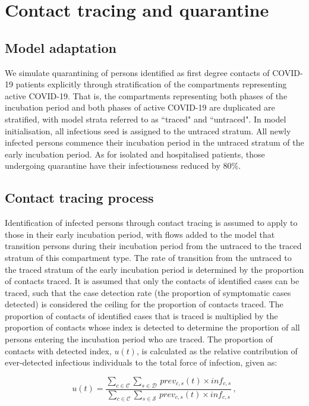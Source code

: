 \section{Contact tracing and quarantine}

\subsection{Model adaptation}
We simulate quarantining of persons identified as first degree contacts of COVID-19 patients explicitly through stratification of the compartments representing active COVID-19.
That is, the compartments representing both phases of the incubation period and both phases of active COVID-19 are duplicated are stratified, with model strata referred to as ``traced" and ``untraced".
In model initialisation, all infectious seed is assigned to the untraced stratum.
All newly infected persons commence their incubation period in the untraced stratum of the early incubation period.
As for isolated and hospitalised patients, those undergoing quarantine have their infectiousness reduced by 80\%.

\subsection{Contact tracing process}
Identification of infected persons through contact tracing is assumed to apply to those in their early incubation period, with flows added to the model that transition persons during their incubation period from the untraced to the traced stratum of this compartment type.
The rate of transition from the untraced to the traced stratum of the early incubation period is determined by the proportion of contacts traced.
It is assumed that only the contacts of identified cases can be traced, such that the case detection rate (the proportion of symptomatic cases detected) is considered the ceiling for the proportion of contacts traced.
The proportion of contacts of identified cases that is traced is multiplied by the proportion of contacts whose index is detected  to determine the proportion of all persons entering the incubation period who are traced.
The proportion of contacts with detected index, \(u(t)\), is calculated as the relative contribution of ever-detected infectious individuals to the total force of infection, given as:

\[
u(t) = \frac
{\sum_{c \in \mathcal{C}} \sum_{s \in \mathcal{D}} \, prev_{c, s}(t) \times inf_{c, s}}
{\sum_{c \in \mathcal{C}} \sum_{s \in \mathcal{S}} \, prev_{c, s}(t) \times inf_{c, s}} \, ,
\]


